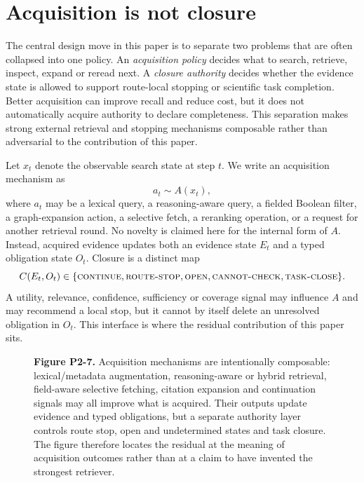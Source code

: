 \section{Acquisition is not closure}
\label{sec:acquisition-authority}

The central design move in this paper is to separate two problems that are often
collapsed into one policy.  An \emph{acquisition policy} decides what to search,
retrieve, inspect, expand or reread next.  A \emph{closure authority} decides
whether the evidence state is allowed to support route-local stopping or
scientific task completion.  Better acquisition can improve recall and reduce
cost, but it does not automatically acquire authority to declare completeness.
This separation makes strong external retrieval and stopping mechanisms
composable rather than adversarial to the contribution of this paper.

Let $x_t$ denote the observable search state at step $t$.  We write an
acquisition mechanism as
\[
  a_t \sim A(x_t),
\]
where $a_t$ may be a lexical query, a reasoning-aware query, a fielded Boolean
filter, a graph-expansion action, a selective fetch, a reranking operation, or a
request for another retrieval round.  No novelty is claimed here for the
internal form of $A$.  Instead, acquired evidence updates both an evidence state
$E_t$ and a typed obligation state $O_t$.  Closure is a distinct map
\[
  C(E_t,O_t) \in \{\textsc{continue},\textsc{route-stop},
  \textsc{open},\textsc{cannot-check},\textsc{task-close}\}.
\]
A utility, relevance, confidence, sufficiency or coverage signal may influence
$A$ and may recommend a local stop, but it cannot by itself delete an unresolved
obligation in $O_t$.  This interface is where the residual contribution of this
paper sits.

\begin{figure}[t]
\centering

\caption{\textbf{Figure P2-7.} Acquisition mechanisms are intentionally
composable: lexical/metadata augmentation, reasoning-aware or hybrid retrieval,
field-aware selective fetching, citation expansion and continuation signals may
all improve what is acquired.  Their outputs update evidence and typed
obligations, but a separate authority layer controls route stop, open and
undetermined states and task closure.  The figure therefore locates the residual
at the meaning of acquisition outcomes rather than at a claim to have invented
the strongest retriever.}
\label{fig:p2-7}
\end{figure}

